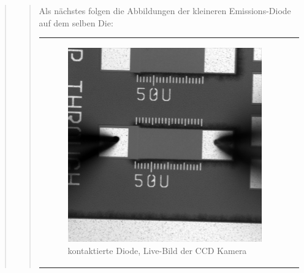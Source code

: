 \begin{quote}
\begin{quote}
        Als nächstes folgen die Abbildungen der kleineren Emissions-Diode auf
        dem selben Die:
             
        
         \begin{center}
                \begin{tabular}{ll}
    
                \hspace{-10em}
                    \begin{minipage}{0.6\textwidth}
    
                        \begin{figure}[H]
                            \label{fig:}
                            \includegraphics[scale=0.25, trim = 0cm 0cm 0cm
                            0cm,
                            clip]{./Emissionsbilder/zwei/nack_Kontaktierung.jpg}
                            \caption{kontaktierte Diode, Live-Bild der CCD
                            Kamera}
                        \end{figure}
    
                    \end{minipage}
                    \begin{minipage}{0.6\textwidth}
    

\end{minipage}
\end{tabular}
\end{center}
\end{quote}
\end{quote}
